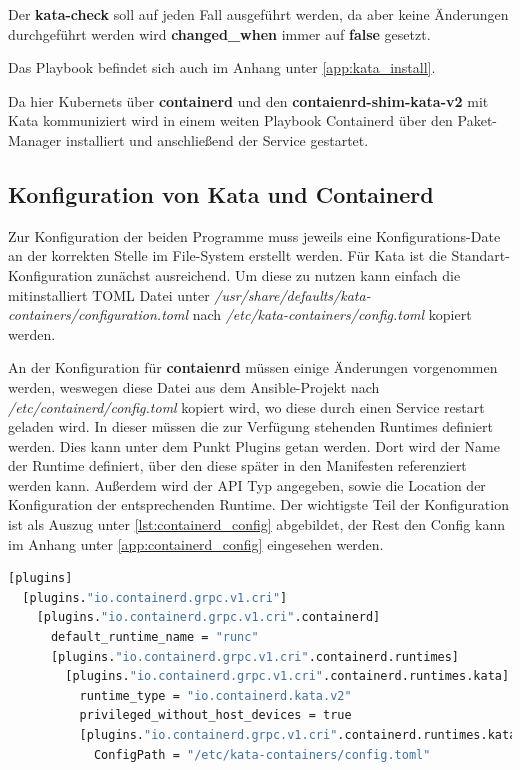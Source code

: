 Der \textbf{kata-check} soll auf jeden Fall ausgeführt werden, da aber keine Änderungen durchgeführt werden wird \textbf{changed\_when} immer auf \textbf{false} gesetzt.

Das Playbook befindet sich auch im Anhang unter \ref{app:kata_install}.

Da hier Kubernets über \textbf{containerd} und den \textbf{contaienrd-shim-kata-v2} mit Kata kommuniziert wird in einem weiten Playbook Containerd über den Paket-Manager installiert und anschließend der Service gestartet.


\subsection{Konfiguration von Kata und Containerd}
\label{ref:kata_config}

Zur Konfiguration der beiden Programme muss jeweils eine Konfigurations-Date an der korrekten Stelle im File-System erstellt werden.
Für Kata ist die Standart-Konfiguration zunächst ausreichend. 
Um diese zu nutzen kann einfach die mitinstalliert \ac{TOML} Datei unter \textit{/usr/share/defaults/kata-containers/configuration.toml} nach \textit{/etc/kata-containers/config.toml} kopiert werden.

An der Konfiguration für \textbf{contaienrd} müssen einige Änderungen vorgenommen werden, weswegen diese Datei aus dem Ansible-Projekt nach \textit{/etc/containerd/config.toml} kopiert wird, wo diese durch einen Service restart geladen wird.
In dieser müssen die zur Verfügung stehenden Runtimes definiert werden.
Dies kann unter dem Punkt Plugins getan werden.
Dort wird der Name der Runtime definiert, über den diese später in den Manifesten referenziert werden kann.
Außerdem wird der \ac{API} Typ angegeben, sowie die Location der Konfiguration der entsprechenden Runtime.
Der wichtigste Teil der Konfiguration ist als Auszug unter \ref{lst:containerd_config} abgebildet, der Rest den Config kann im Anhang unter \ref{app:containerd_config} eingesehen werden.

\begin{lstlisting}[language=bash, caption={/etc/contaienrd/config.toml}, label={lst:containerd_config}]
[plugins]
  [plugins."io.containerd.grpc.v1.cri"]
    [plugins."io.containerd.grpc.v1.cri".containerd]
      default_runtime_name = "runc"
      [plugins."io.containerd.grpc.v1.cri".containerd.runtimes]
        [plugins."io.containerd.grpc.v1.cri".containerd.runtimes.kata]
          runtime_type = "io.containerd.kata.v2"
          privileged_without_host_devices = true
          [plugins."io.containerd.grpc.v1.cri".containerd.runtimes.kata.options]
            ConfigPath = "/etc/kata-containers/config.toml"
\end{lstlisting}

